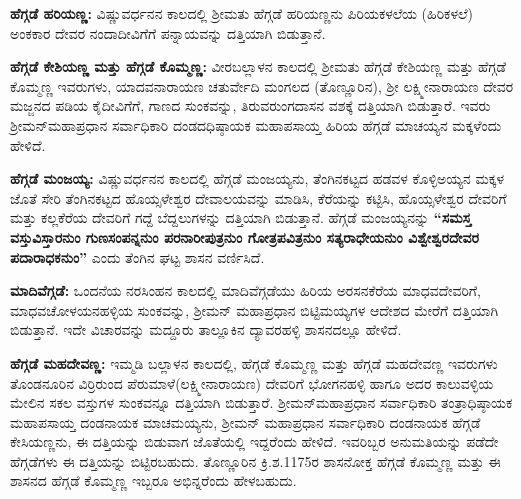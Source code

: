 \textbf{ಹೆಗ್ಗಡೆ ಹರಿಯಣ್ಣ: }ವಿಷ್ಣುವರ್ಧನನ ಕಾಲದಲ್ಲಿ ಶ‍್ರೀಮತು ಹೆಗ್ಗಡೆ ಹರಿಯಣ್ಣನು ಪಿರಿಯಕಳಲೆಯ (ಹಿರಿಕಳಲೆ) ಅಂಕಕಾರ ದೇವರ ನಂದಾದೀವಿಗೆಗೆ ಪನ್ನಾಯವನ್ನು ದತ್ತಿಯಾಗಿ ಬಿಡುತ್ತಾನೆ.

\textbf{ಹೆಗ್ಗಡೆ ಕೇಶಿಯಣ್ಣ ಮತ್ತು ಹೆಗ್ಗಡೆ ಕೊಮ್ಮಣ್ಣ:} ವೀರಬಲ್ಲಾಳನ ಕಾಲದಲ್ಲಿ ಶ‍್ರೀಮತು ಹೆಗ್ಗಡೆ ಕೇಶಿಯಣ್ಣ ಮತ್ತು ಹೆಗ್ಗಡೆ ಕೊಮ್ಮಣ್ಣ ಇವರುಗಳು, ಯಾದವನಾರಾಯಣ ಚತುರ್ವೇದಿ ಮಂಗಲದ (ತೊಣ್ಣೂರಿನ), ಶ‍್ರೀ ಲಕ್ಷ್ಮೀನಾರಾಯಣ ದೇವರ ಮಜ್ಜನದ ಪಡಿಯ ಕೈದೀವಿಗೆಗೆ, ಗಾಣದ ಸುಂಕವನ್ನು, ತಿರುವರುಂಗದಾಸನ ವಶಕ್ಕೆ ದತ್ತಿಯಾಗಿ ಬಿಡುತ್ತಾರೆ. ಇವರು ಶ‍್ರೀಮನ್​ಮಹಾಪ್ರಧಾನ ಸರ್ವಾಧಿಕಾರಿ ದಂಡದಧಿಷ್ಠಾಯಕ ಮಹಾಪಸಾಯ್ತ ಹಿರಿಯ ಹೆಗ್ಗಡೆ ಮಾಚಯ್ಯನ ಮಕ್ಕಳೆಂದು ಹೇಳಿದೆ.

\textbf{ಹೆಗ್ಗಡೆ ಮಂಜಯ್ಯ:} ವಿಷ್ಣುವರ್ಧನನ ಕಾಲದಲ್ಲಿ ಹೆಗ್ಗಡೆ ಮಂಜಯ್ಯನು, ತೆಂಗಿನಕಟ್ಟದ ಹಡವಳ ಕೊಳ್ಳಿಅಯ್ಯನ ಮಕ್ಕಳ ಜೊತೆ ಸೇರಿ ತೆಂಗಿನಕಟ್ಟದ ಹೊಯ್ಸಳೇಶ್ವರ ದೇವಾಲಯವನ್ನು ಮಾಡಿಸಿ, ಕೆರೆಯನ್ನು ಕಟ್ಟಿಸಿ, ಹೊಯ್ಸಳೇಶ್ವರ ದೇವರಿಗೆ ಮತ್ತು ಕಲ್ಲಕೆರೆಯ ದೇವರಿಗೆ ಗದ್ದೆ ಬೆದ್ದಲುಗಳನ್ನು ದತ್ತಿಯಾಗಿ ಬಿಡುತ್ತಾನೆ. ಹೆಗ್ಗಡೆ ಮಂಜಯ್ಯನನ್ನು \textbf{“ಸಮಸ್ತ ವಸ್ತುವಿಸ್ತಾರನುಂ ಗುಣಸಂಪನ್ನನುಂ ಪರನಾರೀಪುತ್ರನುಂ ಗೋತ್ರಪವಿತ್ರನುಂ ಸತ್ಯರಾಧೇಯನುಂ ವಿಶ್ವೇಶ್ವರದೇವರ ಪದಾರಾಧಕನುಂ”} ಎಂದು ತೆಂಗಿನ ಘಟ್ಟ ಶಾಸನ ವರ್ಣಿಸಿದೆ.

\vskip 2pt

\textbf{ಮಾದಿವೆಗ್ಗಡೆ:} ಒಂದನೆಯ ನರಸಿಂಹನ ಕಾಲದಲ್ಲಿ ಮಾದಿವೆಗ್ಗಡೆಯು ಹಿರಿಯ ಅರಸನಕೆರೆಯ ಮಾಧವದೇವರಿಗೆ, ಮಾಧವಚೋಳಯನಹಳ್ಳಿಯ ಸುಂಕವನ್ನು, ಶ‍್ರೀಮನ್​ ಮಹಾಪ್ರಧಾನ ಬಿಟ್ಟಿಮಯ್ಯಗಳ ಆದೇಶದ ಮೇರೆಗೆ ದತ್ತಿಯಾಗಿ ಬಿಡುತ್ತಾನೆ. ಇದೇ ವಿಚಾರವನ್ನು ಮದ್ದೂರು ತಾಲ್ಲೂಕಿನ ದ್ಯಾವರಹಳ್ಳಿ ಶಾಸನದಲ್ಲೂ ಹೇಳಿದೆ.

\vskip 2pt

\textbf{ಹೆಗ್ಗಡೆ ಮಹದೇವಣ್ಣ:} ಇಮ್ಮಡಿ ಬಲ್ಲಾಳನ ಕಾಲದಲ್ಲಿ, ಹೆಗ್ಗಡೆ ಕೊಮ್ಮಣ್ಣ ಮತ್ತು ಹೆಗ್ಗಡೆ ಮಹದೇವಣ್ಣ ಇವರುಗಳು ತೊಂಡನೂರಿನ ವಿರ್ರಿರುಂದ ಪೆರುಮಾಳೆ(ಲಕ್ಷ್ಮೀನಾರಾಯಣ) ದೇವರಿಗೆ ಭೋಗನಹಳ್ಳಿ ಹಾಗೂ ಅದರ ಕಾಲುವಳ್ಳಿಯ ಮೇಲಿನ ಸಕಲ ವಸ್ತುಗಳ ಸುಂಕವನ್ನೂ ದತ್ತಿಯಾಗಿ ಬಿಡುತ್ತಾರೆ. ಶ‍್ರೀಮನ್​ ಮಹಾಪ್ರಧಾನ ಸರ್ವಾಧಿಕಾರಿ ತಂತ್ರಾಧಿಷ್ಠಾಯಕ ಮಹಾಪಸಾಯ್ತ ದಂಡನಾಯಕ ಮಾಚಮಯ್ಯನು, ಶ‍್ರೀಮನ್​ ಮಹಾಪ್ರಧಾನ ಸರ್ವಾಧಿಕಾರಿ ದಂಡನಾಯಕ ಹೆಗ್ಗಡೆ ಕೇಸಿಯಣ್ಣನು, ಈ ದತ್ತಿಯನ್ನು ಬಿಡುವಾಗ ಜೊತೆಯಲ್ಲಿ ಇದ್ದರೆಂದು ಹೇಳಿದೆ. ಇವರಿಬ್ಬರ ಅನುಮತಿಯನ್ನು ಪಡೆದೇ ಹೆಗ್ಗಡೆಗಳು ಈ ದತ್ತಿಯನ್ನು ಬಿಟ್ಟಿರಬಹುದು. ತೊಣ್ಣೂರಿನ ಕ್ರಿ.ಶ.1175ರ ಶಾಸನೋಕ್ತ ಹೆಗ್ಗಡೆ ಕೊಮ್ಮಣ್ಣ ಮತ್ತು ಈ ಶಾಸನದ ಹೆಗ್ಗಡೆ ಕೊಮ್ಮಣ್ಣ ಇಬ್ಬರೂ ಅಭಿನ್ನರೆಂದು ಹೇಳಬಹುದು.

